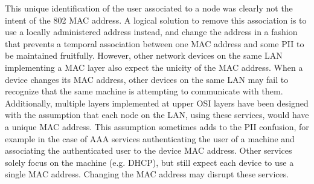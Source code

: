 \documentclass[10pt]{article}
\begin{document}
{	This unique identification of the user associated to a node was clearly not the intent of the 802 MAC address. A logical solution to remove this association is to use a locally administered address instead, and change the address in a fashion that prevents a temporal association between one MAC address and some PII to be maintained fruitfully. However, other network devices on the same LAN implementing a MAC layer also expect the unicity of the MAC address. When a device changes its MAC address, other devices on the same LAN may fail to recognize that the same machine is attempting to communicate with them. Additionally, multiple layers implemented at upper OSI layers have been designed with the assumption that each node on the LAN, using these services, would have a unique MAC address. This assumption sometimes adds to the PII confusion, for example in the case of AAA services authenticating the user of a machine and associating the authenticated user to the device MAC address. Other services solely focus on the machine (e.g. DHCP), but still expect each device to use a single MAC address. Changing the MAC address may disrupt these services. 
	}
\end{document}
